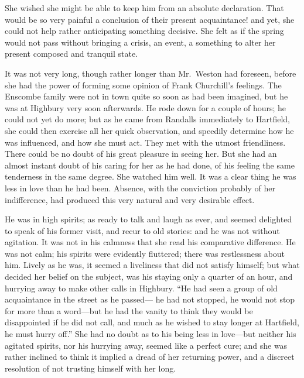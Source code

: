 She wished she might be able to keep him from an absolute declaration.
That would be so very painful a conclusion of their present acquaintance!
and yet, she could not help rather anticipating something decisive.
She felt as if the spring would not pass without bringing a crisis,
an event, a something to alter her present composed and tranquil state.

It was not very long, though rather longer than Mr.\ Weston had foreseen,
before she had the power of forming some opinion of Frank Churchill's
feelings.  The Enscombe family were not in town quite so soon as had
been imagined, but he was at Highbury very soon afterwards.  He rode
down for a couple of hours; he could not yet do more; but as he came
from Randalls immediately to Hartfield, she could then exercise all
her quick observation, and speedily determine how he was influenced,
and how she must act.  They met with the utmost friendliness.
There could be no doubt of his great pleasure in seeing her.
But she had an almost instant doubt of his caring for her as he
had done, of his feeling the same tenderness in the same degree.
She watched him well.  It was a clear thing he was less in love than he
had been.  Absence, with the conviction probably of her indifference,
had produced this very natural and very desirable effect.

He was in high spirits; as ready to talk and laugh as ever, and seemed
delighted to speak of his former visit, and recur to old stories:
and he was not without agitation.  It was not in his calmness that
she read his comparative difference.  He was not calm; his spirits
were evidently fluttered; there was restlessness about him.
Lively as he was, it seemed a liveliness that did not satisfy himself;
but what decided her belief on the subject, was his staying only a
quarter of an hour, and hurrying away to make other calls in Highbury.
``He had seen a group of old acquaintance in the street as he passed---%
he had not stopped, he would not stop for more than a word---but he
had the vanity to think they would be disappointed if he did not call,
and much as he wished to stay longer at Hartfield, he must hurry off.''
She had no doubt as to his being less in love---but neither his
agitated spirits, nor his hurrying away, seemed like a perfect cure;
and she was rather inclined to think it implied a dread of her
returning power, and a discreet resolution of not trusting himself
with her long.


